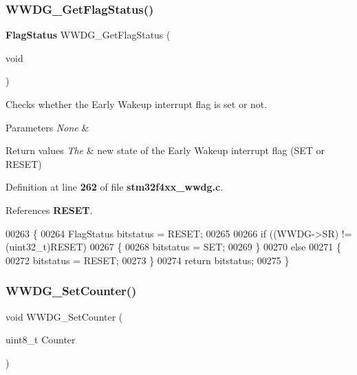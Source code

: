 \subsubsection{W\+W\+D\+G\+\_\+\+Get\+Flag\+Status()}
{\footnotesize\ttfamily \textbf{ Flag\+Status} W\+W\+D\+G\+\_\+\+Get\+Flag\+Status (\begin{DoxyParamCaption}\item[{void}]{ }\end{DoxyParamCaption})}



Checks whether the Early Wakeup interrupt flag is set or not. 


\begin{DoxyParams}{Parameters}
{\em None} & \\
\hline
\end{DoxyParams}

\begin{DoxyRetVals}{Return values}
{\em The} & new state of the Early Wakeup interrupt flag (S\+ET or R\+E\+S\+ET) \\
\hline
\end{DoxyRetVals}


Definition at line \textbf{ 262} of file \textbf{ stm32f4xx\+\_\+wwdg.\+c}.



References \textbf{ R\+E\+S\+ET}.


\begin{DoxyCode}
00263 \{
00264   FlagStatus bitstatus = RESET;
00265     
00266   \textcolor{keywordflow}{if} ((WWDG->SR) != (uint32\_t)RESET)
00267   \{
00268     bitstatus = SET;
00269   \}
00270   \textcolor{keywordflow}{else}
00271   \{
00272     bitstatus = RESET;
00273   \}
00274   \textcolor{keywordflow}{return} bitstatus;
00275 \}
\end{DoxyCode}
\mbox{\label{group__WWDG_ga6e44cc35f133b28b9ad861f459bf8d76}} 
\subsubsection{W\+W\+D\+G\+\_\+\+Set\+Counter()}
{\footnotesize\ttfamily void W\+W\+D\+G\+\_\+\+Set\+Counter (\begin{DoxyParamCaption}\item[{uint8\+\_\+t}]{Counter }\end{DoxyParamCaption})}



